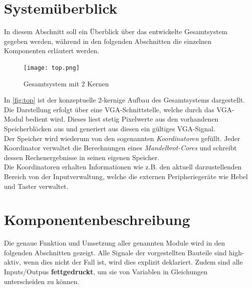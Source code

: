 \documentclass[a4paper,12pt,onesided]{report}
\begin{document}
\section{Systemüberblick}
\label{sec:überblick}
In diesem Abschnitt soll ein Überblick über das entwickelte Gesamtsystem gegeben werden, während in den folgenden Abschnitten die einzelnen Komponenten erläutert werden.

\begin{figure}[H]
	\centering
	\texttt{[image: top.png]}
	\caption{Gesamtsystem mit 2 Kernen}
	\label{fig:top}
\end{figure}

In \autoref{fig:top} ist der konzeptuelle 2-kernige Aufbau des Gesamtsystems dargestellt.\\
Die Darstellung erfolgt über eine VGA-Schnittstelle, welche durch das VGA-Modul bedient wird.
Dieses liest stetig Pixelwerte aus den vorhandenen Speicherblöcken aus und generiert aus diesen ein gültiges VGA-Signal.\\
Der Speicher wird wiederum von den sogenannten \textit{Koordinatoren} gefüllt.
Jeder Koordinator verwaltet die Berechnungen eines \textit{Mandelbrot-Cores} und schreibt dessen Rechenergebnisse in seinen eigenen Speicher.\\
Die Koordinatoren erhalten Informationen wie z.B. den aktuell darzustellenden Bereich von der Inputverwaltung, welche die externen Peripheriegeräte wie Hebel und Taster verwaltet.\\

\section{Komponentenbeschreibung}
Die genaue Funktion und Umsetzung aller genannten Module wird in den folgenden Abschnitten gezeigt.
Alle Signale der vorgestellten Bauteile sind high-aktiv, wenn dies nicht der Fall ist, wird dies explizit deklariert.
Zudem sind alle Inputs/Outpus \textbf{fettgedruckt}, um sie von Variablen in Gleichungen unterscheiden zu können.
\end{document}
